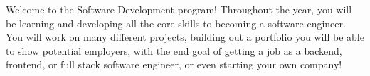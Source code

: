 Welcome to the Software Development program! Throughout the year, you will be learning and developing all the core skills to becoming
a software engineer. You will work on many different projects, building out a portfolio you will be able to show potential employers, with
the end goal of getting a job as a backend, frontend, or full stack software engineer, or even starting your own company!
